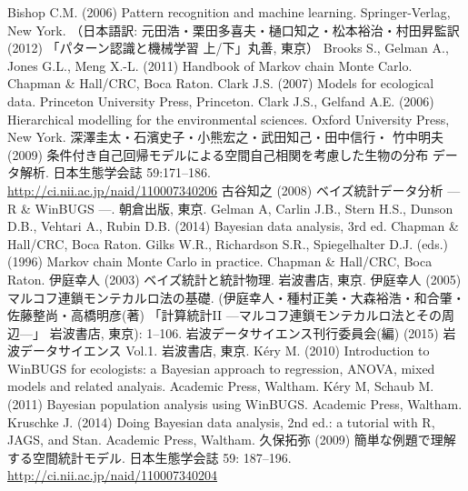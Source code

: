 \documentclass[11pt,uplatex]{jsarticle}
\begin{document}
\begin{thebibliography}{99}
 Bishop C.M. (2006) Pattern recognition and machine learning.
  Springer-Verlag, New York.
  （日本語訳: 元田浩・栗田多喜夫・樋口知之・松本裕治・村田昇監訳 (2012)
  「パターン認識と機械学習 上/下」丸善, 東京）
 Brooks S., Gelman A., Jones G.L., Meng X.-L. (2011)
Handbook of Markov chain Monte Carlo. Chapman \& Hall/CRC, Boca Raton. 
 Clark J.S. (2007) Models for ecological data.
  Princeton University Press, Princeton.
 Clark J.S., Gelfand A.E. (2006) Hierarchical modelling
  for the environmental sciences. Oxford University Press, New York.
 深澤圭太・石濱史子・小熊宏之・武田知己・田中信行・
  竹中明夫 (2009) 条件付き自己回帰モデルによる空間自己相関を考慮した生物の分布
  データ解析. 日本生態学会誌 59:171--186. \\
  \url{http://ci.nii.ac.jp/naid/110007340206}
 古谷知之 (2008) ベイズ統計データ分析 --- R \& WinBUGS ---.
  朝倉出版, 東京.
 Gelman A, Carlin J.B., Stern H.S., Dunson D.B., Vehtari A.,
  Rubin D.B. (2014) Bayesian data analysis, 3rd ed.
  Chapman \& Hall/CRC, Boca Raton.
 Gilks W.R., Richardson S.R., Spiegelhalter D.J. (eds.) (1996)
  Markov chain Monte Carlo in practice. Chapman \& Hall/CRC, Boca Raton.
 伊庭幸人 (2003) ベイズ統計と統計物理. 岩波書店, 東京.
 伊庭幸人 (2005) マルコフ連鎖モンテカルロ法の基礎. 
  (伊庭幸人・種村正美・大森裕浩・和合肇・佐藤整尚・高橋明彦(著)
  「計算統計II ---マルコフ連鎖モンテカルロ法とその周辺---」
  岩波書店, 東京): 1--106.
 岩波データサイエンス刊行委員会(編) (2015) 岩波データサイエンス Vol.1.
岩波書店, 東京.
 K\'ery M. (2010) Introduction to WinBUGS for ecologists:
  a Bayesian approach to regression, ANOVA, mixed models and related analyais.
  Academic Press, Waltham.
 K\'ery M, Schaub M. (2011) Bayesian population analysis using WinBUGS.
  Academic Press, Waltham.
 Kruschke J. (2014) Doing Bayesian data analysis, 2nd ed.:
  a tutorial with R, JAGS, and Stan. Academic Press, Waltham.
 久保拓弥 (2009) 簡単な例題で理解する空間統計モデル. 
  日本生態学会誌 59: 187--196. \\
  \url{http://ci.nii.ac.jp/naid/110007340204}

\end{thebibliography}
\end{document}
